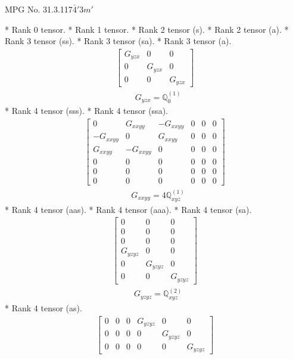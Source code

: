 \documentclass[fleqn,8pt,landscape]{jsarticle}
\begin{document}
\setcounter{MaxMatrixCols}{32}

\renewcommand{\tablename}{Table~}
\renewcommand{\figurename}{Figure~}
\begin{center}
\LARGE
MPG No. 31.3.117\quad$\bar{4}'3m'$
\end{center}
* Rank 0 tensor.
* Rank 1 tensor.
* Rank 2 tensor (s).
* Rank 2 tensor (a).
* Rank 3 tensor (ss).
* Rank 3 tensor (sa).
* Rank 3 tensor (a).
\begin{align*}
\begin{bmatrix} G_{yzx} & 0 & 0 \\ 0 & G_{yzx} & 0 \\ 0 & 0 & G_{yzx} \end{bmatrix}
\end{align*}
\begin{align*}
& G_{yzx} = \mathbb{Q}_{0}^{(1)}
\end{align*}
* Rank 4 tensor (sss).
* Rank 4 tensor (ssa).
\begin{align*}
\begin{bmatrix} 0 & G_{xxyy} & - G_{xxyy} & 0 & 0 & 0 \\ - G_{xxyy} & 0 & G_{xxyy} & 0 & 0 & 0 \\ G_{xxyy} & - G_{xxyy} & 0 & 0 & 0 & 0 \\ 0 & 0 & 0 & 0 & 0 & 0 \\ 0 & 0 & 0 & 0 & 0 & 0 \\ 0 & 0 & 0 & 0 & 0 & 0 \end{bmatrix}
\end{align*}
\begin{align*}
& G_{xxyy} = 4 \mathbb{Q}_{xyz}^{(1)}
\end{align*}
* Rank 4 tensor (aas).
* Rank 4 tensor (aaa).
* Rank 4 tensor (sa).
\begin{align*}
\begin{bmatrix} 0 & 0 & 0 \\ 0 & 0 & 0 \\ 0 & 0 & 0 \\ G_{yzyz} & 0 & 0 \\ 0 & G_{yzyz} & 0 \\ 0 & 0 & G_{yzyz} \end{bmatrix}
\end{align*}
\begin{align*}
& G_{yzyz} = \mathbb{Q}_{xyz}^{(2)}
\end{align*}
* Rank 4 tensor (as).
\begin{align*}
\begin{bmatrix} 0 & 0 & 0 & G_{yzyz} & 0 & 0 \\ 0 & 0 & 0 & 0 & G_{yzyz} & 0 \\ 0 & 0 & 0 & 0 & 0 & G_{yzyz} \end{bmatrix}
\end{align*}
\end{document}
